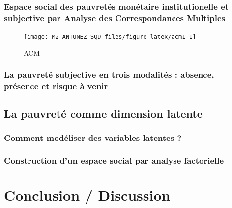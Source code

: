 \documentclass[12pt,a4paper]{reedthesis}
\begin{document}
\hypertarget{espace-social-des-pauvretuxe9s-monuxe9taire-institutionelle-et-subjective-par-analyse-des-correspondances-multiples}{%
\subsection{Espace social des pauvretés monétaire institutionelle et subjective par Analyse des Correspondances Multiples}\label{espace-social-des-pauvretuxe9s-monuxe9taire-institutionelle-et-subjective-par-analyse-des-correspondances-multiples}}
\begin{figure}

{\centering \texttt{[image: M2\_ANTUNEZ\_SQD\_files/figure-latex/acm1-1]} 

}

\caption{ACM}\label{fig:acm1}
\end{figure}
\hypertarget{la-pauvretuxe9-subjective-en-trois-modalituxe9s-absence-pruxe9sence-et-risque-uxe0-venir}{%
\subsection{La pauvreté subjective en trois modalités : absence, présence et risque à venir}\label{la-pauvretuxe9-subjective-en-trois-modalituxe9s-absence-pruxe9sence-et-risque-uxe0-venir}}

\hypertarget{la-pauvretuxe9-comme-dimension-latente}{%
\section{La pauvreté comme dimension latente}\label{la-pauvretuxe9-comme-dimension-latente}}

\hypertarget{comment-moduxe9liser-des-variables-latentes}{%
\subsection{Comment modéliser des variables latentes ?}\label{comment-moduxe9liser-des-variables-latentes}}

\hypertarget{construction-dun-espace-social-par-analyse-factorielle}{%
\subsection{Construction d'un espace social par analyse factorielle}\label{construction-dun-espace-social-par-analyse-factorielle}}

\hypertarget{conclusion-discussion}{%
\chapter*{Conclusion / Discussion}\label{conclusion-discussion}}
\end{document}
